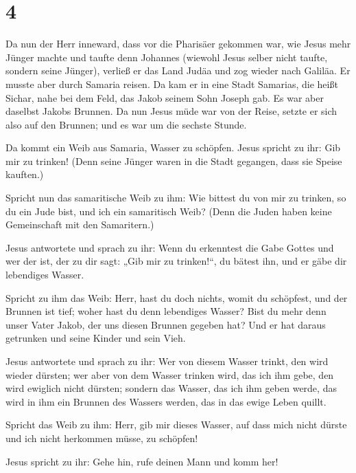 \hypertarget{section-3}{%
\section{4}\label{section-3}}

 Da nun der Herr inneward, dass vor die Pharisäer gekommen
war, wie Jesus mehr Jünger machte und taufte denn Johannes
 (wiewohl Jesus selber nicht taufte, sondern seine
Jünger),  verließ er das Land Judäa und zog wieder nach
Galiläa.  Er musste aber durch Samaria reisen.
 Da kam er in eine Stadt Samarias, die heißt Sichar, nahe
bei dem Feld, das Jakob seinem Sohn Joseph gab.  Es war
aber daselbst Jakobs Brunnen. Da nun Jesus müde war von der Reise,
setzte er sich also auf den Brunnen; und es war um die sechste Stunde.

 Da kommt ein Weib aus Samaria, Wasser zu schöpfen. Jesus
spricht zu ihr: Gib mir zu trinken!  (Denn seine Jünger
waren in die Stadt gegangen, dass sie Speise kauften.)

 Spricht nun das samaritische Weib zu ihm: Wie bittest du
von mir zu trinken, so du ein Jude bist, und ich ein samaritisch Weib?
(Denn die Juden haben keine Gemeinschaft mit den Samaritern.)

 Jesus antwortete und sprach zu ihr: Wenn du erkenntest
die Gabe Gottes und wer der ist, der zu dir sagt: „Gib mir zu
trinken!{}``, du bätest ihn, und er gäbe dir lebendiges Wasser.

 Spricht zu ihm das Weib: Herr, hast du doch nichts,
womit du schöpfest, und der Brunnen ist tief; woher hast du denn
lebendiges Wasser?  Bist du mehr denn unser Vater Jakob,
der uns diesen Brunnen gegeben hat? Und er hat daraus getrunken und
seine Kinder und sein Vieh.

 Jesus antwortete und sprach zu ihr: Wer von diesem
Wasser trinkt, den wird wieder dürsten;  wer aber von dem
Wasser trinken wird, das ich ihm gebe, den wird ewiglich nicht dürsten;
sondern das Wasser, das ich ihm geben werde, das wird in ihm ein Brunnen
des Wassers werden, das in das ewige Leben quillt.

 Spricht das Weib zu ihm: Herr, gib mir dieses Wasser,
auf dass mich nicht dürste und ich nicht herkommen müsse, zu schöpfen!

 Jesus spricht zu ihr: Gehe hin, rufe deinen Mann und
komm her!

